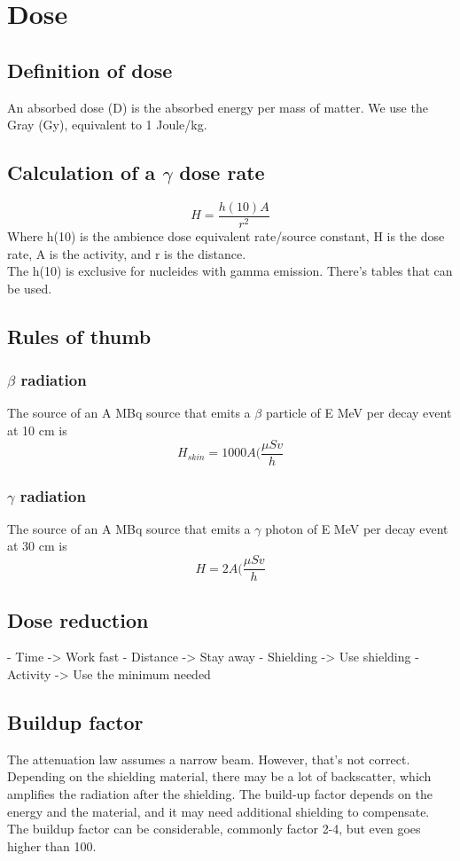 \section{Dose}
\subsection{Definition of dose}
An absorbed dose (D) is the absorbed energy per mass of matter. We use the Gray (Gy), equivalent to 1 Joule/kg.
\subsection{Calculation of a $\gamma$ dose rate}
\[ H = \frac{h(10)A}{r^2} \]
Where h(10) is the ambience dose equivalent rate/source constant, H is the dose rate, A is the activity, and r is the distance.\\
The h(10) is exclusive for nucleides with gamma emission. There's tables that can be used.
\subsection{Rules of thumb}

\subsubsection{$\beta$ radiation}
The source of an A MBq source that emits a $\beta$ particle of E MeV per decay event at 10 cm is
\[ H_{skin} = 1000A (\frac{\mu Sv}{h} \]

\subsubsection{$\gamma$ radiation}
The source of an A MBq source that emits a $\gamma$ photon of E MeV per decay event at 30 cm is
\[ H = 2A (\frac{\mu Sv}{h} \]

\subsection{Dose reduction}
- Time -> Work fast
- Distance -> Stay away
- Shielding -> Use shielding
- Activity -> Use the minimum needed

\subsection{Buildup factor}
The attenuation law assumes a narrow beam. However, that's not correct. Depending on the shielding material, there may be a lot of backscatter, which amplifies the radiation after the shielding. The build-up factor depends on the energy and the material, and it may need additional shielding to compensate. The buildup factor can be considerable, commonly factor 2-4, but even goes higher than 100.

